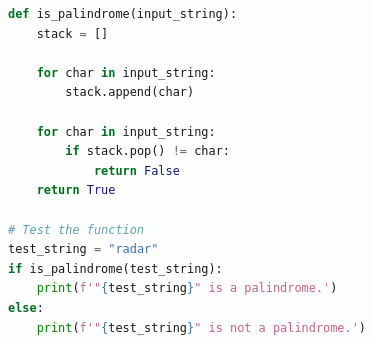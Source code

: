 \begin{lstlisting}[language=Python]
def is_palindrome(input_string):
    stack = []

    for char in input_string:
        stack.append(char)

    for char in input_string:
        if stack.pop() != char:
            return False
    return True

# Test the function
test_string = "radar"
if is_palindrome(test_string):
    print(f'"{test_string}" is a palindrome.')
else:
    print(f'"{test_string}" is not a palindrome.')
\end{lstlisting}

% 
